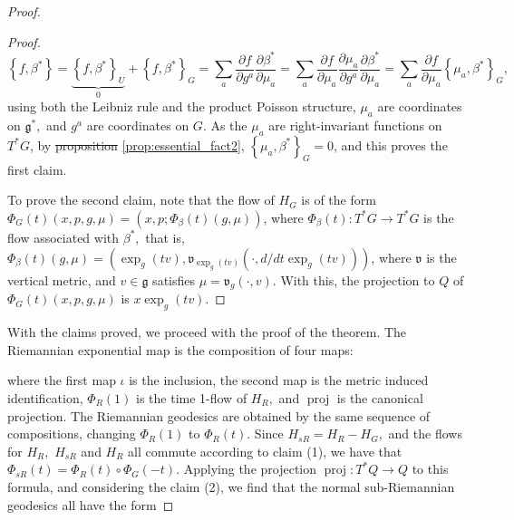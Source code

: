 \documentclass[12pt, letterpaper, reqno]{amsart}
\theoremstyle{definition}
\theoremstyle{plain}
\theoremstyle{remark}
\providecommand{\DIFadd}[1]{{\protect\color{blue}\uwave{#1}}} %
\providecommand{\DIFdel}[1]{{\protect\color{red}\sout{#1}}}                      %
\providecommand{\DIFaddbegin}{} %
\providecommand{\DIFaddend}{} %
\providecommand{\DIFdelbegin}{} %
\providecommand{\DIFdelend}{} %
\newcommand{\DIFscaledelfig}{0.5}
\newlength{\DIFdelgraphicswidth} %
\newlength{\DIFdelgraphicsheight} %
\newcommand{\DIFaddincludegraphics}[2][]{{\color{blue}\fbox{\DIFOincludegraphics[#1]{#2}}}} %
\newcommand{\DIFdelincludegraphics}[2][]{%
\sbox{\DIFdelgraphicsbox}{\DIFOincludegraphics[#1]{#2}}%
\settoboxwidth{\DIFdelgraphicswidth}{\DIFdelgraphicsbox} %
\settoboxtotalheight{\DIFdelgraphicsheight}{\DIFdelgraphicsbox} %
\scalebox{\DIFscaledelfig}{%
\parbox[b]{\DIFdelgraphicswidth}{\usebox{\DIFdelgraphicsbox}\\[-\baselineskip] \rule{\DIFdelgraphicswidth}{0em}}\llap{\resizebox{\DIFdelgraphicswidth}{\DIFdelgraphicsheight}{%
\setlength{\unitlength}{\DIFdelgraphicswidth}%
\begin{picture}(1,1)%
\thicklines\linethickness{2pt} %
{\color[rgb]{1,0,0}\put(0,0){\framebox(1,1){}}}%
{\color[rgb]{1,0,0}\put(0,0){\line( 1,1){1}}}%
{\color[rgb]{1,0,0}\put(0,1){\line(1,-1){1}}}%
\end{picture}%
}\hspace*{3pt}}} %
} %
\DeclareRobustCommand{\DIFaddbegin}{\DIFOaddbegin \let\includegraphics\DIFaddincludegraphics} %
\DeclareRobustCommand{\DIFaddend}{\DIFOaddend \let\includegraphics\DIFOincludegraphics} %
\DeclareRobustCommand{\DIFdelbegin}{\DIFOdelbegin \let\includegraphics\DIFdelincludegraphics} %
\DeclareRobustCommand{\DIFdelend}{\DIFOaddend \let\includegraphics\DIFOincludegraphics} %
\begin{document}
\begin{proof}
\begin{proof}
		$$ \left\{ f,\beta^* \right\} = \underbrace{\left\{ f,\beta^* \right\}_U}_0 + \left\{ f,\beta^* \right\}_G = \sum^{}_{a} \frac{\partial f}{\partial g^a} \frac{\partial \beta^*}{\partial \mu_a} = \sum^{}_{a} \frac{\partial f}{\partial \mu_a} \frac{\partial \mu_a}{\partial g^a} \frac{\partial \beta^*}{\partial \mu_a}  = \sum^{}_{a} \frac{\partial f}{\partial \mu_a} \left\{ \mu_a, \beta^* \right\}_G, $$ 
		using both the Leibniz rule and the product Poisson structure, $ \mu_a $ are coordinates on $ \mathfrak{g}^*, $ and $ g^a $ are coordinates on $ G. $ As the $ \mu_a $ are right-invariant functions on $ T^*G$, by \DIFdelbegin \DIFdel{proposition }\DIFdelend \DIFaddbegin \DIFadd{Proposition }\DIFaddend \ref{prop:essential_fact2}, $ \left\{ \mu_a,\beta^* \right\}_G =0 $, and this proves the first claim.

		To prove the second claim, note that the flow of $ H_G $ is of the form $\Phi_G(t)(x,p,g,\mu)= (x,p; \Phi_\beta(t)(g,\mu))$, where $ \Phi_\beta(t): T^*G \rightarrow T^*G$ is the flow associated with $ \beta^*, $ that is, $ \Phi_\beta(t)(g,\mu)=( \operatorname{exp}_g(tv), \mathfrak{v}_{ \operatorname{exp}_g(tv) }(\cdot, d/dt \operatorname{exp}_g(tv) ) ) $, where $ \mathfrak{v} $ is the vertical metric, and $ v \in \mathfrak{g} $ satisfies $ \mu = \mathfrak{v}_g(\cdot,v). $ With this, the projection to $ Q $ of $ \Phi_G(t)(x,p,g,\mu) $ is $ x \operatorname{exp}_g(tv). $  
	\end{proof}
	With the claims proved, we proceed with the proof of the theorem. The Riemannian exponential map is the composition of four maps:
	\begin{center}
	\end{center}
	where the first map $ \iota $ is the inclusion, the second map is the metric induced identification, $ \Phi_R(1) $ is the time 1-flow of $ H_R, $ and $ \operatorname{proj}  $ is the canonical projection. The Riemannian geodesics are obtained by the same sequence of compositions, changing $ \Phi_R(1) $ to $ \Phi_R(t). $ Since \DIFdelbegin \DIFdel{$ H_{sR} = H_R - H_G, $ }\DIFdelend \DIFaddbegin \DIFadd{$ H_{\rm sR} = H_R - H_G, $ }\DIFaddend and the flows for $ H_R, $ \DIFdelbegin \DIFdel{$ H_{sR} $ }\DIFdelend \DIFaddbegin \DIFadd{$ H_{\rm sR} $ }\DIFaddend and $ H_R $ all commute according to claim (1), we have that \DIFdelbegin \DIFdel{$ \Phi_{sR}(t)= \Phi_R(t)\circ \Phi_G(-t). $  }\DIFdelend \DIFaddbegin \DIFadd{$ \Phi_{\rm sR}(t)= \Phi_R(t)\circ \Phi_G(-t). $  }\DIFaddend Applying the projection $ \operatorname{proj} :T^*Q \rightarrow Q $ to this formula, and considering the claim (2), we find that the normal sub-Riemannian geodesics all have the form 

\end{proof}
\end{document}
